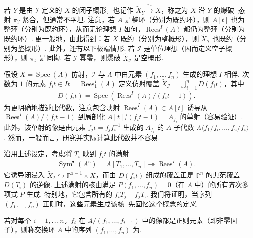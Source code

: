 若 $Y$ 是由 $\mathcal I$ 定义的 $X$ 的闭子概形，也记作 $\widetilde X_Y\xrightarrow{\pi_Y}X$，称之为 $X$ 沿 $Y$ 的爆破. 态射 $\pi_Y$ 紧合，但通常不平坦. 注意，若 $A$ 是整环（分别为既约环），则 $A[t]$ 也为整环（分别为既约环），从而无论理想 $I$ 如何，$\operatorname{Rees}^{I}(A)$ 都仍为整环（分别为既约环）. 更一般地，由此得到：若 $X$ 既约（分别为整概形），则 $\widetilde X_{\mathcal I}$ 也既约（分别为整概形）.
此外，还有以下极端情形. 若 $\mathcal I$ 是单位理想（因而定义空子概形），则 $\pi_{\mathcal I}$ 是同构. 若 $\mathcal I$ 幂零，则爆破 $\widetilde X_{\mathcal I}$ 是空概形.
\begin{numpara}[仿射情形的局部描述]\label{item:ag-2-2-3}
假设 $X=\operatorname{Spec}(A)$ 仿射，$\mathcal I$ 与 $A$ 中由元素 $(f_1,\ldots,f_n)$ 生成的理想 $I$ 相伴. 次数为 $1$ 的元素 $f_it\in It=\operatorname{Rees}^{I}_1(A)$ 定义仿射覆盖 $\widetilde X_{\mathcal I}=\bigcup_{i=1}^nD(f_it)$，其中
\begin{align*}
D(f_it)=\operatorname{Spec}(\operatorname{Rees}^{I}(A)/(f_it-1)).
\end{align*}
为更明确地描述此代数，注意包含映射 $\operatorname{Rees}^{I}(A)\subset A[t]$ 诱导从 $\operatorname{Rees}^{I}(A)/(f_it-1)$ 到局部化 $A[t]/(f_it-1)=A_{f_i}$ 的单射（容易验证）. 此外，该单射的像是由元素 $f_jt=f_jf_i^{-1}$ 生成的 $A_{f_i}$ 的 $A$-子代数 $A\langle f_1/f_i,\ldots,f_n/f_i\rangle$. 然而，一般而言，研究并实际计算此代数并不容易.
\end{numpara}
\begin{numpara}[正则理想的爆破]\label{item:ag-2-2-4}
沿用上述设定，考虑将 $T_i$ 映到 $f_it$ 的满射
\begin{align}
\operatorname{Sym}^{\bullet}(A^n)=A[T_1,\ldots,T_n]\twoheadrightarrow\operatorname{Rees}^{I}(A).\tag{2.2.4.1}\label{eq:ag-2-2-4-1}
\end{align}
它诱导闭浸入 $\widetilde X_{\mathcal I}\hookrightarrow\mathbb P^{n-1}\times X$，而由 $D(f_it)$ 组成的覆盖正是 $\mathbb P^n$ 的典范覆盖 $D(T_i)$ 的逆像. 上述满射的核由满足 $P(f_1,\ldots,f_n)=0$（在 $A$ 中）的所有齐次多项式 $P$ 生成. 特别地，它包含所有的 $f_iT_j-f_jT_i$. 我们将证明，当序列 $(f_1,\ldots,f_n)$ 正则时，这些元素生成该核. 先回忆这个概念的定义.
\end{numpara}
\begin{definition*}
若对每个 $i=1,\ldots,n$，$f_i$ 在 $A/(f_1,\ldots,f_{i-1})$ 中的像都是正则元素（即非零因子），则称交换环 $A$ 中的序列 $(f_1,\ldots,f_n)$ 为.
\end{definition*}
